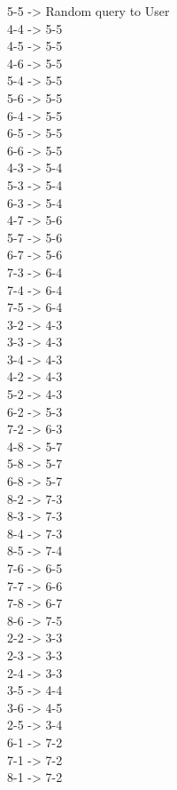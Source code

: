 5-5     ->  Random query to User\\
4-4     ->  5-5\\
4-5     ->  5-5\\
4-6     ->  5-5\\
5-4     ->  5-5\\
5-6     ->  5-5\\
6-4     ->  5-5\\
6-5     ->  5-5\\
6-6     ->  5-5\\
4-3     ->  5-4\\
5-3     ->  5-4\\
6-3     ->  5-4\\
4-7     ->  5-6\\
5-7     ->  5-6\\
6-7     ->  5-6\\
7-3     ->  6-4\\
7-4     ->  6-4\\
7-5     ->  6-4\\
3-2     ->  4-3\\
3-3     ->  4-3\\
3-4     ->  4-3\\
4-2     ->  4-3\\
5-2     ->  4-3\\
6-2     ->  5-3\\
7-2     ->  6-3\\
4-8     ->  5-7\\
5-8     ->  5-7\\
6-8     ->  5-7\\
8-2     ->  7-3\\
8-3     ->  7-3\\
8-4     ->  7-3\\
8-5     ->  7-4\\
7-6     ->  6-5\\
7-7     ->  6-6\\
7-8     ->  6-7\\
8-6     ->  7-5\\
2-2     ->  3-3\\
2-3     ->  3-3\\
2-4     ->  3-3\\
3-5     ->  4-4\\
3-6     ->  4-5\\
2-5     ->  3-4\\
6-1     ->  7-2\\
7-1     ->  7-2\\
8-1     ->  7-2\\
